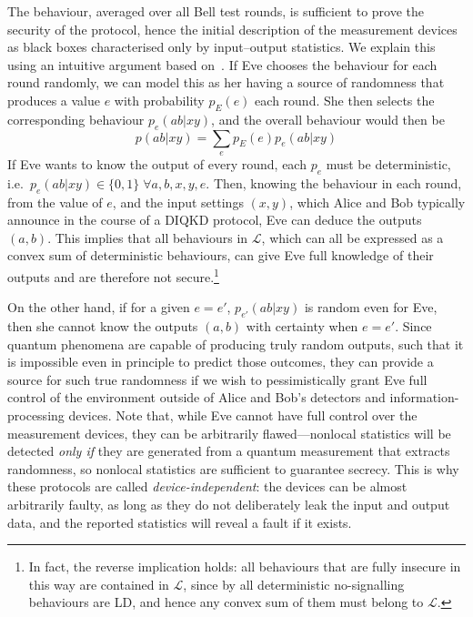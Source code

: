 \documentclass[10pt, a4paper]{article}
\numberwithin{equation}{section} %
\theoremstyle{definition}
\theoremstyle{plain}
\newcommand{\?}{\mathrel{?}} %
\newcommand{\Ls}{\mathcal{L}}
\begin{document}
    The behaviour, averaged over all Bell test rounds, is sufficient to prove the security of the protocol, hence the initial description of the measurement devices as black boxes characterised only by input--output statistics. We explain this using an intuitive argument based on~\cite[Sec. 1.3]{DIQKD_Lower}. If Eve chooses the behaviour for each round randomly, we can model this as her having a source of randomness that produces a value \(e\) with probability \(p_E(e)\) each round. She then selects the corresponding behaviour \(p_e(ab|xy)\), and the overall behaviour would then be
    \begin{equation}\label{eqn:eveattack}
      p(ab|xy) = \sum_e p_E(e) p_e(ab|xy)
    \end{equation}
    If Eve wants to know the output of every round, each \(p_e\) must be deterministic, i.e.\ \(p_e(ab|xy) \in \{0, 1\}\;\forall a,b,x,y,e\). Then, knowing the behaviour in each round, from the value of \(e\), and the input settings \((x,y)\), which Alice and Bob typically announce in the course of a DIQKD protocol, Eve can deduce the outputs \((a,b)\). This implies that all behaviours in \(\Ls\), which can all be expressed as a convex sum of deterministic behaviours, can give Eve full knowledge of their outputs and are therefore not secure.\footnote{In fact, the reverse implication holds: all behaviours that are fully insecure in this way are contained in \(\Ls\), since by  all deterministic no-signalling behaviours are LD, and hence any convex sum of them must belong to \(\Ls\).}

    On the other hand, if for a given \(e = e'\), \(p_{e'}(ab|xy)\) is random even for Eve, then she cannot know the outputs \((a,b)\) with certainty when \(e=e'\). Since quantum phenomena are capable of producing truly random outputs, such that it is impossible even in principle to predict those outcomes, they can provide a source for such true randomness if we wish to pessimistically grant Eve full control of the environment outside of Alice and Bob's detectors and information-processing devices. Note that, while Eve cannot have full control over the measurement devices, they can be arbitrarily flawed---nonlocal statistics will be detected \emph{only if} they are generated from a quantum measurement that extracts randomness, so nonlocal statistics are sufficient to guarantee secrecy. This is why these protocols are called \emph{device-independent}: the devices can be almost arbitrarily faulty, as long as they do not deliberately leak the input and output data, and the reported statistics will reveal a fault if it exists.
\end{document}
